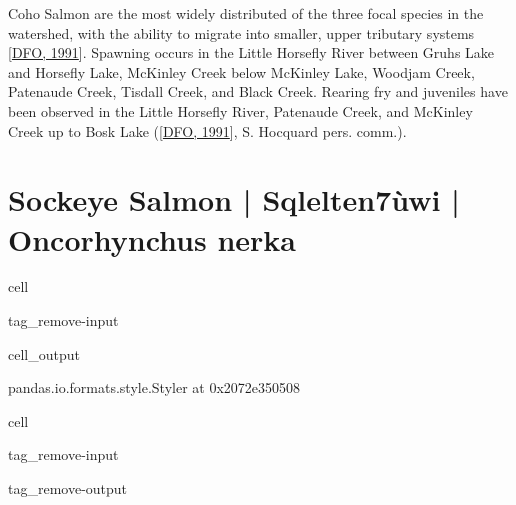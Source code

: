 \documentclass[letterpaper,10pt,english]{jupyterBook}
\begin{document}
\sphinxAtStartPar
Coho Salmon are the most widely distributed of the three focal species in the watershed, with the ability to migrate into smaller, upper tributary systems {[}\hyperlink{cite.references:id11}{DFO, 1991}{]}. Spawning occurs in the Little Horsefly River between Gruhs Lake and Horsefly Lake, McKinley Creek below McKinley Lake, Woodjam Creek, Patenaude Creek, Tisdall Creek, and Black Creek. Rearing fry and juveniles have been observed in the Little Horsefly River, Patenaude Creek, and McKinley Creek up to Bosk Lake ({[}\hyperlink{cite.references:id11}{DFO, 1991}{]}, S. Hocquard pers. comm.).


\section{Sockeye Salmon | Sqlelten7ùwi | Oncorhynchus nerka}
\label{\detokenize{Planning:sockeye-salmon-sqlelten7uwi-oncorhynchus-nerka}}
\begin{sphinxuseclass}{cell}
\begin{sphinxuseclass}{tag_remove-input}\begin{sphinxVerbatimOutput}

\begin{sphinxuseclass}{cell_output}
\begin{sphinxVerbatim}[commandchars=\\\{\}]
\PYGZlt{}pandas.io.formats.style.Styler at 0x2072e350508\PYGZgt{}
\end{sphinxVerbatim}

\end{sphinxuseclass}\end{sphinxVerbatimOutput}

\end{sphinxuseclass}
\end{sphinxuseclass}
\begin{sphinxuseclass}{cell}
\begin{sphinxuseclass}{tag_remove-input}
\begin{sphinxuseclass}{tag_remove-output}
\end{sphinxuseclass}
\end{sphinxuseclass}
\end{sphinxuseclass}
\end{document}
